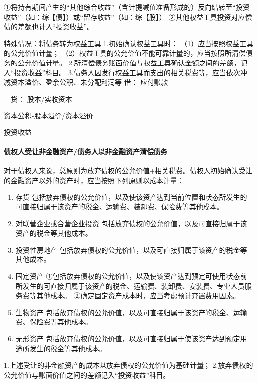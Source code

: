 \documentclass[UTF8,12pt]{ctexart}
\newenvironment{Dr}{\noindent 借：}{\par}
\newenvironment{Cr}{\noindent \ \ 贷：}{\par}
\numberwithin{equation}{section} %
\numberwithin{figure}{section}
\numberwithin{table}{section}
\begin{document}
	①将持有期间产生的“其他综合收益”（含计提减值准备形成的）反向结转至“投资收益”（如：综【债】）或“留存收益”（如：综【股】）
	②其他权益工具投资对应偿债的差额也计入“投资收益”。
	
	特殊情况：将债务转为权益工具
	1.初始确认权益工具时：
	（1）应当按照权益工具的公允价值计量；
	（2）权益工具的公允价值不能可靠计量的，应当按照所清偿债务的公允价值计量。
	2.所清偿债务账面价值与权益工具确认金额之间的差额，记入“投资收益”科目。
	3.债务人因发行权益工具而支出的相关税费等，应当依次冲减资本溢价、盈余公积、未分配利润等
	\begin{Dr}
		应付账款
	\end{Dr}
	\begin{Cr}
		股本/实收资本
		
		资本公积-股本溢价/资本溢价
		
		投资收益
	\end{Cr}
	
	\paragraph{债权人受让非金融资产/债务人以非金融资产清偿债务}
	对于债权人来说，总原则为放弃债权的公允价值+相关税费。债权人初始确认受让的金融资产以外的资产时，应当按照下列原则以成本计量：
	\begin{enumerate}
		\item 存货	包括放弃债权的公允价值，以及使该资产达到当前位置和状态所发生的可直接归属于该资产的税金、运输费、装卸费、保险费等其他成本。
		
		\item 对联营企业或合营企业投资	包括放弃债权的公允价值，以及可直接归属于该资产的税金等其他成本。
		
		\item 投资性房地产	包括放弃债权的公允价值，以及可直接归属于该资产的税金等其他成本。
		
		\item 固定资产	①包括放弃债权的公允价值，以及使该资产达到预定可使用状态前所发生的可直接归属于该资产的税金、运输费、装卸费、安装费、专业人员服务费等其他成本。
		②确定固定资产成本时，应当考虑预计弃置费用因素。
		
		\item 生物资产	包括放弃债权的公允价值，以及可直接归属于该资产的税金、运输费、保险费等其他成本。
		
		\item 无形资产	包括放弃债权的公允价值，以及可直接归属于使该资产达到预定用途所发生的税金等其他成本。
		
	\end{enumerate}
	1.上述受让的非金融资产的成本以放弃债权的公允价值为基础计量；
	2.放弃债权的公允价值与账面价值之间的差额记入“投资收益”科目。
	
\end{document}

